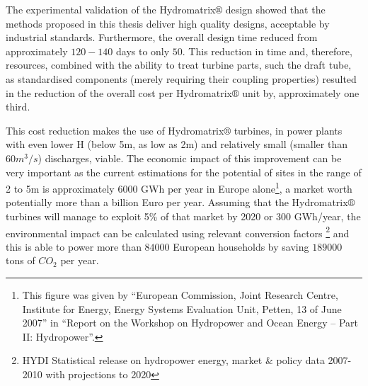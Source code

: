 The experimental validation of the Hydromatrix$\circledR$ design showed that the methods proposed in this thesis deliver high quality designs, acceptable by industrial standards. Furthermore, the overall design time reduced from approximately $120-140$ days to only $50$. This reduction in time and, therefore, resources, combined with the ability to treat turbine parts, such the draft tube, as standardised components (merely requiring  their coupling properties) resulted in the reduction of the overall cost per Hydromatrix$\circledR$ unit by, approximately  one third.

This cost reduction makes the use of Hydromatrix$\circledR$ turbines, in power plants with even lower H (below 5m, as low as 2m)  and relatively small (smaller than $60m^3/s$) discharges, viable. The economic impact of this improvement can be very important as the current estimations for the potential of sites in the range of 2 to 5m is approximately $6000$ GWh
per year in Europe alone\footnote{This figure was given by ``European Commission, Joint Research Centre, Institute for Energy, Energy Systems Evaluation Unit,  Petten, 13 of June 2007'' in  ``Report on the Workshop on Hydropower and Ocean Energy – Part II: Hydropower''.}, a market worth potentially more than a billion Euro per year. Assuming that the Hydromatrix$\circledR$ turbines will manage to exploit 5\% of that market by 2020 or $300$ GWh/year, the environmental impact can be calculated using relevant conversion factors \footnote{HYDI Statistical release on hydropower energy, market \& policy data 2007-2010 with projections to 2020} and this is able to power more than $84000$ European households by saving $189000$ tons of $CO_2$ per year.

  

 





 







 






